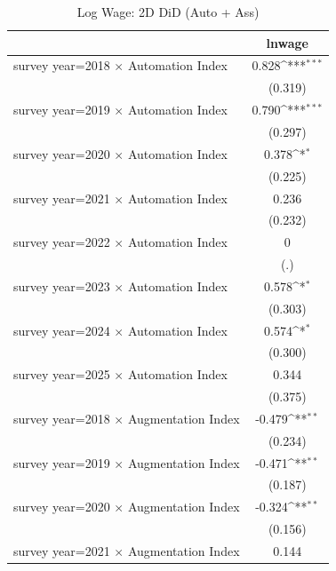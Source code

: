 \begin{table}[htbp]\centering
\def\sym#1{\ifmmode^{#1}\else\(^{#1}\)\fi}
\caption{Log Wage: 2D DiD (Auto + Ass)}
\begin{tabular}{l*{1}{c}}
\toprule
                    &\multicolumn{1}{c}{lnwage}\\
\midrule
survey year=2018 $\times$ Automation Index&       0.828\sym{***}\\
                    &     (0.319)         \\
\addlinespace
survey year=2019 $\times$ Automation Index&       0.790\sym{***}\\
                    &     (0.297)         \\
\addlinespace
survey year=2020 $\times$ Automation Index&       0.378\sym{*}  \\
                    &     (0.225)         \\
\addlinespace
survey year=2021 $\times$ Automation Index&       0.236         \\
                    &     (0.232)         \\
\addlinespace
survey year=2022 $\times$ Automation Index&           0         \\
                    &         (.)         \\
\addlinespace
survey year=2023 $\times$ Automation Index&       0.578\sym{*}  \\
                    &     (0.303)         \\
\addlinespace
survey year=2024 $\times$ Automation Index&       0.574\sym{*}  \\
                    &     (0.300)         \\
\addlinespace
survey year=2025 $\times$ Automation Index&       0.344         \\
                    &     (0.375)         \\
\addlinespace
survey year=2018 $\times$ Augmentation Index&      -0.479\sym{**} \\
                    &     (0.234)         \\
\addlinespace
survey year=2019 $\times$ Augmentation Index&      -0.471\sym{**} \\
                    &     (0.187)         \\
\addlinespace
survey year=2020 $\times$ Augmentation Index&      -0.324\sym{**} \\
                    &     (0.156)         \\
\addlinespace
survey year=2021 $\times$ Augmentation Index&       0.144         \\

\end{tabular}
\end{table}

